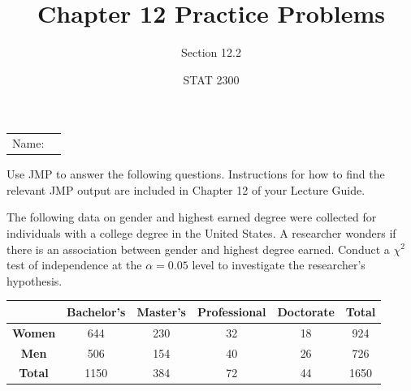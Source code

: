 \documentclass[noanswers]{exam}
\title{Chapter 12 Practice Problems}
\author{Section 12.2}
\date{STAT 2300}
\begin{document}
\noindent\begin{tabular}{@{}p{.3in}p{3in}@{}}
Name: & \hrulefill
\end{tabular}

\vspace{2mm}

\noindent Use JMP to answer the following questions. Instructions for how to find the relevant JMP output are included in Chapter 12 of your Lecture Guide.

\begin{questions} 

\question The following data on gender and highest earned degree were collected for individuals with a college degree in the United States. A researcher wonders if there is an association between gender and highest degree earned. Conduct a $\chi^2$ test of independence at the $\alpha=0.05$ level to investigate the researcher's hypothesis.

\begin{center}
\begin{tabular}{|c|c|c|c|c||c|}
\hline
 & \textbf{Bachelor's} & \textbf{Master's} & \textbf{Professional} & \textbf{Doctorate} & \textbf{Total} \\
 \hline
 \textbf{Women} & 644 & 230 & 32 & 18 & 924\\
 \hline
 \textbf{Men} & 506 & 154 & 40 & 26 & 726 \\
 \hline
 \hline
 \textbf{Total} & 1150 & 384 & 72 & 44 & 1650 \\
 \hline
\end{tabular}
\end{center}

\vspace{2mm}

\end{questions}
\end{document}
